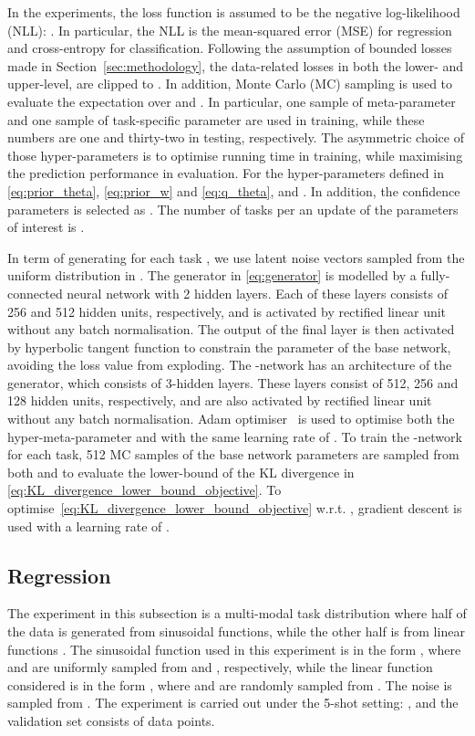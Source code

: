     In the experiments, the loss function  is assumed to be the negative log-likelihood (NLL): . In particular, the NLL is the mean-squared error (MSE) for regression and cross-entropy for classification. Following the assumption of bounded losses made in Section~\ref{sec:methodology}, the data-related losses in both the lower- and upper-level,  are clipped to . In addition, Monte Carlo (MC) sampling is used to evaluate the expectation over  and . In particular, one sample of meta-parameter  and one sample of task-specific parameter  are used in training, while these numbers are one and thirty-two in testing, respectively. The asymmetric choice of those hyper-parameters is to optimise running time in training, while maximising the prediction performance in evaluation. For the hyper-parameters defined in \eqref{eq:prior_theta}, \eqref{eq:prior_w} and \eqref{eq:q_theta},  and . In addition, the confidence parameters is selected as . The number of tasks per an update of the parameters of interest is .

    In term of generating  for each task , we use latent noise vectors  sampled from the uniform distribution in . The generator in \eqref{eq:generator} is modelled by a fully-connected neural network with 2 hidden layers. Each of these layers consists of 256 and 512 hidden units, respectively, and is activated by rectified linear unit without any batch normalisation. The output of the final layer is then activated by hyperbolic tangent function to constrain the parameter of the base network, avoiding the loss value from exploding. The -network has an  architecture of the generator, which consists of 3-hidden layers. These layers consist of 512, 256 and 128 hidden units, respectively, and are also activated by rectified linear unit without any batch normalisation. Adam optimiser~\citep{kingma2015adam} is used to optimise both the hyper-meta-parameter  and  with the same learning rate of . To train the -network for each task, 512 MC samples of the base network parameters are sampled from both  and  to evaluate the lower-bound of the KL divergence in \eqref{eq:KL_divergence_lower_bound_objective}. To optimise~\eqref{eq:KL_divergence_lower_bound_objective} w.r.t. , gradient descent is used with a learning rate of . 

    \subsection{Regression}
    \label{sec:regression}
    	The experiment in this subsection is a multi-modal task distribution where half of the data is generated from sinusoidal functions, while the other half is from linear functions \cite{finn2018probabilistic}. The sinusoidal function used in this experiment is in the form , where  and  are uniformly sampled from  and , respectively, while the linear function considered is in the form , where  and  are randomly sampled from . The noise  is sampled from . The experiment is carried out under the 5-shot setting: , and the validation set  consists of  data points. 

